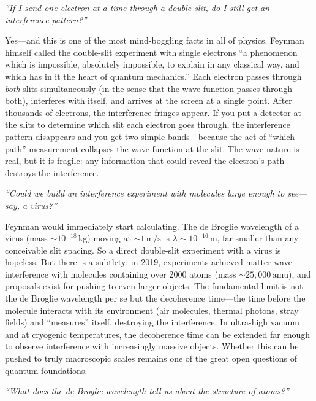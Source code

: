 \documentclass[11pt,openright]{book}
\begin{document}
\textit{``If I send one electron at a time through a double slit, do I still get an interference pattern?''}

Yes---and this is one of the most mind-boggling facts in all of physics. Feynman himself called the double-slit experiment with single electrons ``a phenomenon which is impossible, absolutely impossible, to explain in any classical way, and which has in it the heart of quantum mechanics.'' Each electron passes through \emph{both} slits simultaneously (in the sense that the wave function passes through both), interferes with itself, and arrives at the screen at a single point. After thousands of electrons, the interference fringes appear. If you put a detector at the slits to determine which slit each electron goes through, the interference pattern disappears and you get two simple bands---because the act of ``which-path'' measurement collapses the wave function at the slit. The wave nature is real, but it is fragile: any information that could reveal the electron's path destroys the interference.

\textit{``Could we build an interference experiment with molecules large enough to see---say, a virus?''}

Feynman would immediately start calculating. The de Broglie wavelength of a virus (mass $\sim 10^{-18}\,\text{kg}$) moving at $\sim 1\,\text{m/s}$ is $\lambda \sim 10^{-16}\,\text{m}$, far smaller than any conceivable slit spacing. So a direct double-slit experiment with a virus is hopeless. But there is a subtlety: in 2019, experiments achieved matter-wave interference with molecules containing over 2000 atoms (mass $\sim 25{,}000\,\text{amu}$), and proposals exist for pushing to even larger objects. The fundamental limit is not the de Broglie wavelength per se but the decoherence time---the time before the molecule interacts with its environment (air molecules, thermal photons, stray fields) and ``measures'' itself, destroying the interference. In ultra-high vacuum and at cryogenic temperatures, the decoherence time can be extended far enough to observe interference with increasingly massive objects. Whether this can be pushed to truly macroscopic scales remains one of the great open questions of quantum foundations.

\textit{``What does the de Broglie wavelength tell us about the structure of atoms?''}
\end{document}
